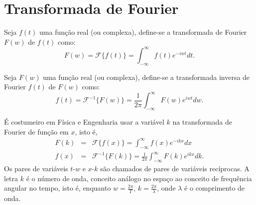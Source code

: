 \section{Transformada de Fourier}
\begin{defn}Seja $f(t)$ uma função real (ou complexa), define-se a transformada de Fourier $F(w)$ de $f(t)$ como:
\begin{equation}
F(w)=\mathcal{F}\{f(t)\}=\int_{-\infty}^\infty f(t)e^{-iwt}dt.
\end{equation}
\end{defn}
\begin{defn}Seja $F(w)$ uma função real (ou complexa), define-se a transformada inversa de Fourier $f(t)$ de $F(w)$ como:
\begin{equation}
f(t)=\mathcal{F}^{-1}\{F(w)\}=\frac{1}{2\pi}\int_{-\infty}^\infty F(w)e^{iwt}dw.
\end{equation}
\end{defn}
\begin{obs}É costumeiro em Física e Engenharia usar a variável $k$ na transformada de Fourier de função em $x$, isto é,
\begin{eqnarray*}
F(k)&=&\mathcal{F}\{f(x)\}=\int_{-\infty}^\infty f(x)e^{-ikx}dx\\
f(x)&=&\mathcal{F}^{-1}\{F(k)\}=\frac{1}{2\pi}\int_{-\infty}^\infty F(k)e^{ikx}dk.
\end{eqnarray*}
Os pares de variáveis $t$-$w$ e $x$-$k$ são chamados de pares de variáveis recíprocas. A letra $k$ é o número de onda, conceito análogo no espaço ao conceito de frequência angular no tempo, isto é, enquanto $w=\frac{2\pi}{T}$, $k=\frac{2\pi}{\lambda}$, onde $\lambda$ é o comprimento de onda.	
\end{obs}
